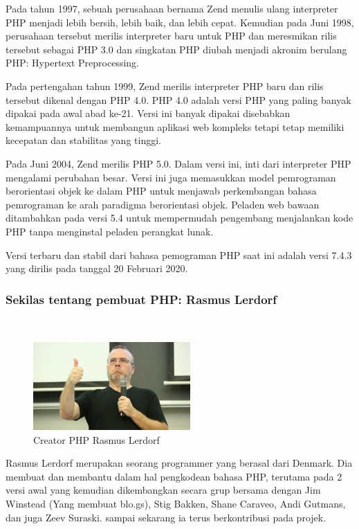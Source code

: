 Pada tahun 1997, sebuah perusahaan bernama Zend menulis ulang interpreter PHP menjadi lebih bersih, lebih baik, dan lebih cepat. Kemudian pada Juni 1998, perusahaan tersebut merilis interpreter baru untuk PHP dan meresmikan rilis tersebut sebagai PHP 3.0 dan singkatan PHP diubah menjadi akronim berulang PHP: Hypertext Preprocessing.

Pada pertengahan tahun 1999, Zend merilis interpreter PHP baru dan rilis tersebut dikenal dengan PHP 4.0. PHP 4.0 adalah versi PHP yang paling banyak dipakai pada awal abad ke-21. Versi ini banyak dipakai disebabkan kemampuannya untuk membangun aplikasi web kompleks tetapi tetap memiliki kecepatan dan stabilitas yang tinggi.

Pada Juni 2004, Zend merilis PHP 5.0. Dalam versi ini, inti dari interpreter PHP mengalami perubahan besar. Versi ini juga memasukkan model pemrograman berorientasi objek ke dalam PHP untuk menjawab perkembangan bahasa pemrograman ke arah paradigma berorientasi objek. Peladen web bawaan ditambahkan pada versi 5.4 untuk mempermudah pengembang menjalankan kode PHP tanpa menginstal peladen perangkat lunak.

Versi terbaru dan stabil dari bahasa pemograman PHP saat ini adalah versi 7.4.3 yang dirilis pada tanggal 20 Februari 2020.

\subsubsection{Sekilas tentang pembuat PHP: Rasmus Lerdorf}
\hfill\\
	\begin{figure}[H]
		\includegraphics[width=6cm]{figures/web/rasmus.jpg}
		\centering
		\caption{Creator PHP Rasmus Lerdorf }
	\end{figure}
	
Rasmus Lerdorf merupakan seorang programmer yang berasal dari Denmark. Dia membuat dan membantu dalam hal pengkodean bahasa PHP, terutama pada 2 versi awal yang kemudian dikembangkan secara grup bersama dengan Jim Winstead (Yang membuat blo.gs), Stig Bakken, Shane Caraveo, Andi Gutmans, dan juga Zeev Suraski. sampai sekarang ia terus berkontribusi pada projek.

